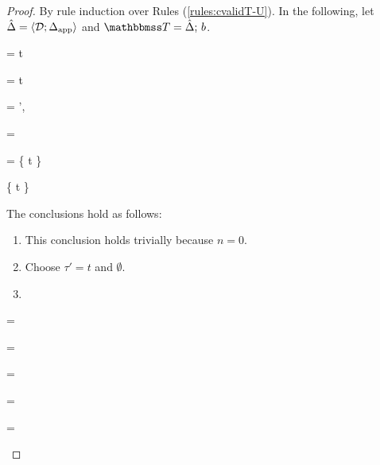 \begin{proof}
By rule induction over Rules (\ref{rules:cvalidT-U}). In the following, let $\hat{\Delta} = \langle \mathcal{D}; \Delta_\text{app} \rangle$ and $\tscenev=\tsceneU{\uDelta}{b}$.
\begin{byCases}
  \item[\text{(\ref{rule:cvalidT-U-tvar})}] 
    \begin{pfsteps}
    \item \ctau = t 
    \item \tau = t 
    \item \Delta = \Delta',   
    \item \summaryOf{\ctau} = \emptyset {}
    \item {} = \{ t \}  
    \item \{ t \} \subset \domof{\Delta} \cup \emptyset {} 
    \end{pfsteps}
    The conclusions hold as follows:
    \begin{enumerate}
    \item This conclusion holds trivially because $n=0$.
    \item Choose $\tau'=t$ and $\emptyset$.
    \item {}
    \end{enumerate}
    \resetpfcounter
  \item[\text{(\ref{rule:cvalidT-U-parr})}] 
    \begin{pfsteps}
    \item \ctau =  
    \item \tau =  
    \item {}  
    \item {}  
    \item \summaryOf{\ctau} =  \cup {}  
    \item {} =   
    \item {} =   

\end{pfsteps}
\end{byCases}
\end{proof}
